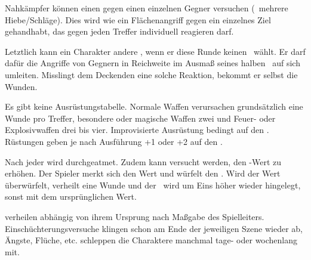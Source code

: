 {	Nahkämpfer können einen  gegen einen einzelnen Gegner versuchen (\zB\ mehrere Hiebe/Schläge). Dies wird wie ein Flächenangriff gegen ein einzelnes Ziel gehandhabt, das gegen jeden Treffer individuell reagieren darf.

	Letztlich kann ein Charakter andere , wenn er diese Runde keinen \AD\ wählt. Er darf dafür die Angriffe von Gegnern in Reichweite im Ausmaß seines halben \RD\ auf sich umleiten. Misslingt dem Deckenden eine solche Reaktion, bekommt er selbst die Wunden.


	\noindent
	Es gibt keine Ausrüstungstabelle. Normale Waffen verursachen grundsätzlich eine Wunde pro Treffer, besondere oder magische Waffen zwei und Feuer- oder Explosivwaffen drei bis vier. Improvisierte Ausrüstung bedingt  auf den \AD. Rüstungen geben je nach Ausführung +1 oder +2 auf den \RD.


	\noindent
	Nach jeder  wird durchgeatmet. Zudem kann versucht werden, den \HD-Wert zu erhöhen. Der Spieler merkt sich den Wert und würfelt den \HD. Wird der Wert überwürfelt, verheilt eine Wunde und der \HD\ wird um Eins höher wieder hingelegt, sonst mit dem ursprünglichen Wert.

	 verheilen abhängig von ihrem Ursprung nach Maßgabe des Spielleiters. Einschüchterungsversuche klingen schon am Ende der jeweiligen Szene wieder ab, Ängste, Flüche, etc. schleppen die Charaktere manchmal tage- oder wochenlang mit.
}

